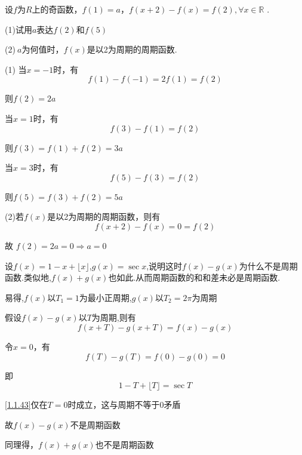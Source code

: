 \begin{exercise}
    设$f$为$R$上的奇函数，$f(1)=a$，$f(x+2)-f(x)=f(2),\forall x \in \mathbb{R}$ .

    (1)试用$a$表达$f(2)$和$f(5)$

    (2)$\ a$为何值时，$f(x)$是以2为周期的周期函数. 
\end{exercise}

\begin{solution}
    
    (1)
    当$x=-1$时，有
    \begin{equation*}
        f(1)-f(-1) = 2f(1) = f(2)
    \end{equation*}

    则$f(2)=2a$

    当$x=1$时，有
    \begin{equation*}
        f(3)-f(1) = f(2)
    \end{equation*}

    则$f(3)=f(1)+f(2)=3a$

    当$x=3$时，有
    \begin{equation*}
        f(5)-f(3) = f(2)
    \end{equation*}

    则$f(5)=f(3)+f(2)=5a$

    (2)若$f(x)$是以2为周期的周期函数，则有
    \begin{equation*}
        f(x+2)-f(x)=0=f(2)
    \end{equation*}

    故 $f(2)=2a=0 \Rightarrow a=0$
\end{solution}

\begin{exercise}
    设$f(x)=1-x+\lfloor x \rfloor$,$g(x)=\sec x$,说明这时$f(x)-g(x)$为什么不是周期函数.类似地,$f(x)+g(x)$也如此.从而周期函数的和和差未必是周期函数.
\end{exercise}

\begin{solution}
    
    易得,$f(x)$以$T_1=1$为最小正周期,$g(x)$以$T_2=2\pi$为周期

    假设$f(x)-g(x)$以$T$为周期,则有
    \begin{equation*}
        f(x+T)-g(x+T)=f(x)-g(x)
    \end{equation*}

    令$x=0$，有
    \begin{equation*}
        f(T)-g(T)=f(0)-g(0)=0
    \end{equation*}
    
    即
    \begin{equation}
        1-T+\lfloor T \rfloor= \sec T   \label{1.1.43}
    \end{equation}

    \cref{1.1.43}仅在$T=0$时成立，这与周期不等于0矛盾

    故$f(x)-g(x)$不是周期函数

    同理得，$f(x)+g(x)$也不是周期函数
\end{solution}

